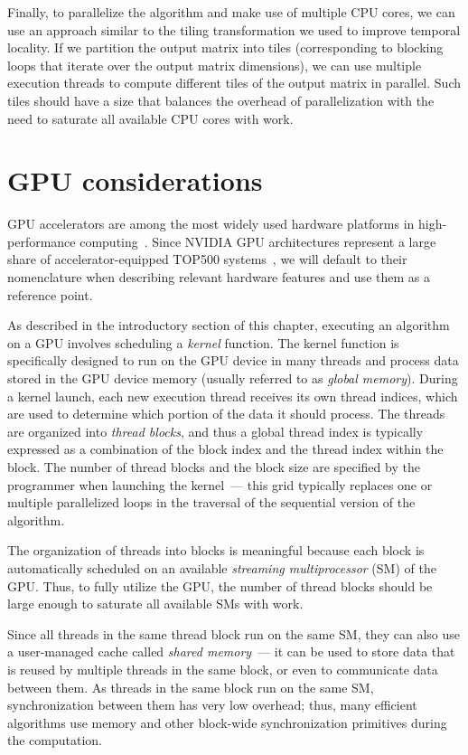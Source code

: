 Finally, to parallelize the algorithm and make use of multiple CPU cores, we can use an approach similar to the tiling transformation we used to improve temporal locality. If we partition the output matrix into tiles (corresponding to blocking loops that iterate over the output matrix dimensions), we can use multiple execution threads to compute different tiles of the output matrix in parallel.
Such tiles should have a size that balances the overhead of parallelization with the need to saturate all available CPU cores with work.


\section{GPU considerations}\label{sec:gpu-considerations}

GPU accelerators are among the most widely used hardware platforms in high-performance computing~\cite{top500}. Since NVIDIA GPU architectures represent a large share of accelerator-equipped TOP500 systems~\cite{top500}, we will default to their nomenclature when describing relevant hardware features and use them as a reference point.

As described in the introductory section of this chapter, executing an algorithm on a GPU involves scheduling a \emph{kernel} function. The kernel function is specifically designed to run on the GPU device in many threads and process data stored in the GPU device memory (usually referred to as \emph{global memory}). During a kernel launch, each new execution thread receives its own thread indices, which are used to determine which portion of the data it should process. The threads are organized into \emph{thread blocks}, and thus a global thread index is typically expressed as a combination of the block index and the thread index within the block. The number of thread blocks and the block size are specified by the programmer when launching the kernel~--- this grid typically replaces one or multiple parallelized loops in the traversal of the sequential version of the algorithm.

The organization of threads into blocks is meaningful because each block is automatically scheduled on an available \emph{streaming multiprocessor} (SM) of the GPU\@. Thus, to fully utilize the GPU, the number of thread blocks should be large enough to saturate all available SMs with work.

Since all threads in the same thread block run on the same SM, they can also use a user-managed cache called \emph{shared memory}~--- it can be used to store data that is reused by multiple threads in the same block, or even to communicate data between them. As threads in the same block run on the same SM, synchronization between them has very low overhead; thus, many efficient algorithms use memory and other block-wide synchronization primitives during the computation.

